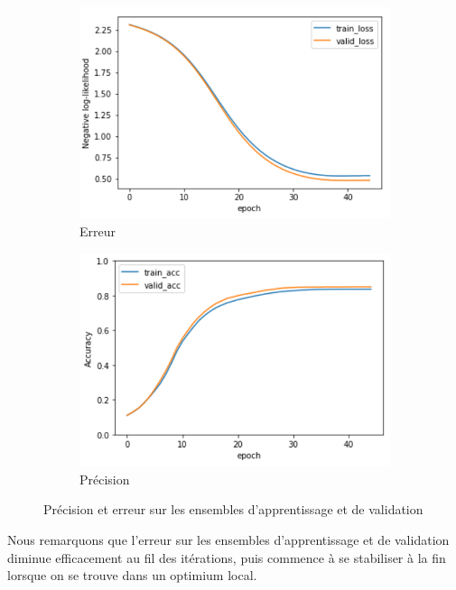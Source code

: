 \documentclass[a4paper,english,12pt]{article}
\begin{document}
\begin{figure}[H]
	\centering
	\begin{subfigure}{0.45\textwidth}
		\includegraphics[width=\textwidth]{Error}
		\caption{Erreur}
	\end{subfigure}
	\begin{subfigure}{0.45\textwidth}
		\includegraphics[width=\textwidth]{accuracy}
		\caption{Précision}
	\end{subfigure}
	\caption{Précision et erreur sur les ensembles d'apprentissage et de validation}
\end{figure}

Nous remarquons que l'erreur sur les ensembles d'apprentissage et de validation diminue efficacement au fil des itérations, puis commence à se stabiliser à la fin lorsque on se trouve dans un optimium local.
\end{document}
